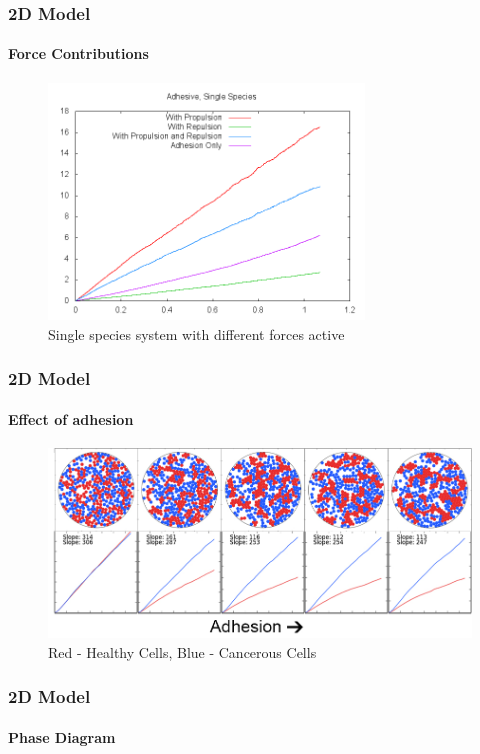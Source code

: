 \documentclass{beamer}
\begin{document}
  \begin{frame}
    \frametitle{2D Model}
    \framesubtitle{Force Contributions}
    \begin{figure}
      \includegraphics[width=3.3in]{msd2D.png}
      \caption{Single species system with different forces active}
    \end{figure}
    \vfill
  \end{frame}

  \begin{frame}
    \frametitle{2D Model}
    \framesubtitle{Effect of adhesion}
    \begin{figure}
      \includegraphics[width=4.5in]{adhinc.jpg}
      \caption{Red - Healthy Cells, Blue - Cancerous Cells}
    \end{figure}
    \vfill
  \end{frame}


  \begin{frame}
    \frametitle{2D Model}
    \framesubtitle{Phase Diagram}
    \begin{columns}[t] 
    \begin{figure}
    \end{figure}
    \begin{figure}
    \end{figure}
    \end{columns}
    \vfill
  \end{frame}
  
\end{document}

